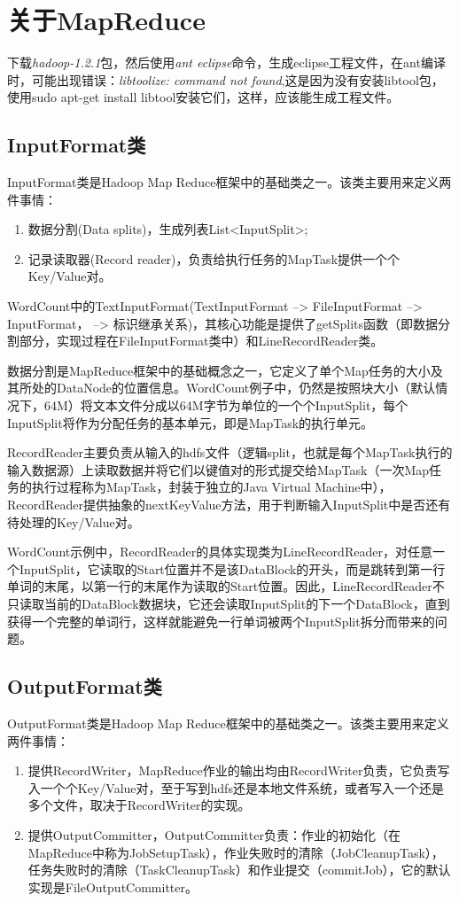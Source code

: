\section{关于MapReduce}
\par 下载\textsl{hadoop-1.2.1}包，然后使用\textsl{ant eclipse}命令，生成eclipse工程文件，在ant编译时，可能出现错误：\textsl{libtoolize: command not found},这是因为没有安装libtool包，使用\textsf{sudo apt-get install libtool}安装它们，这样，应该能生成工程文件。
\subsection{InputFormat类}
\par InputFormat类是Hadoop Map Reduce框架中的基础类之一。该类主要用来定义两件事情：
\begin{enumerate}[(1)]
\item 数据分割(Data splits)，生成列表List<InputSplit>;
\item 记录读取器(Record reader)，负责给执行任务的MapTask提供一个个Key/Value对。
\end{enumerate}
\par WordCount中的TextInputFormat(TextInputFormat --> FileInputFormat --> InputFormat， --> 标识继承关系)，其核心功能是提供了getSplits函数（即数据分割部分，实现过程在FileInputFormat类中）和LineRecordReader类。
\par 数据分割是MapReduce框架中的基础概念之一，它定义了单个Map任务的大小及其所处的DataNode的位置信息。WordCount例子中，仍然是按照块大小（默认情况下，64M）将文本文件分成以64M字节为单位的一个个InputSplit，每个InputSplit将作为分配任务的基本单元，即是MapTask的执行单元。
\par RecordReader主要负责从输入的hdfs文件（逻辑split，也就是每个MapTask执行的输入数据源）上读取数据并将它们以键值对的形式提交给MapTask（一次Map任务的执行过程称为MapTask，封装于独立的Java Virtual Machine中），RecordReader提供抽象的nextKeyValue方法，用于判断输入InputSplit中是否还有待处理的Key/Value对。
\par WordCount示例中，RecordReader的具体实现类为LineRecordReader，对任意一个InputSplit，它读取的Start位置并不是该DataBlock的开头，而是跳转到第一行单词的末尾，以第一行的末尾作为读取的Start位置。因此，LineRecordReader不只读取当前的DataBlock数据块，它还会读取InputSplit的下一个DataBlock，直到获得一个完整的单词行，这样就能避免一行单词被两个InputSplit拆分而带来的问题。
\subsection{OutputFormat类}
OutputFormat类是Hadoop Map Reduce框架中的基础类之一。该类主要用来定义两件事情：
\begin{enumerate}[(1)]
\item 提供RecordWriter，MapReduce作业的输出均由RecordWriter负责，它负责写入一个个Key/Value对，至于写到hdfs还是本地文件系统，或者写入一个还是多个文件，取决于RecordWriter的实现。
\item 提供OutputCommitter，OutputCommitter负责：作业的初始化（在MapReduce中称为JobSetupTask），作业失败时的清除（JobCleanupTask），任务失败时的清除（TaskCleanupTask）和作业提交（commitJob），它的默认实现是FileOutputCommitter。
\end{enumerate}
